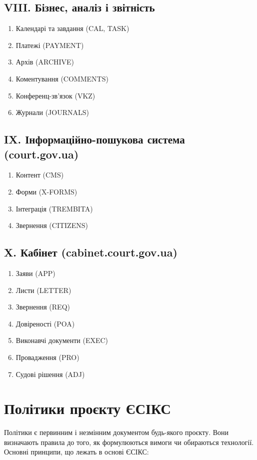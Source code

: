 \subsection{VIII. Бізнес, аналіз і звітність}
\begin{enumerate}
    \item Календарі та завдання (CAL, TASK)
    \item Платежі (PAYMENT)
    \item Архів (ARCHIVE)
    \item Коментування (COMMENTS)
    \item Конференц-зв'язок (VKZ)
    \item Журнали (JOURNALS)
\end{enumerate}

\subsection{IX. Інформаційно-пошукова система (court.gov.ua)}
\begin{enumerate}
    \item Контент (CMS)
    \item Форми (X-FORMS)
    \item Інтеграція (TREMBITA)
    \item Звернення (CITIZENS)
\end{enumerate}

\subsection{X. Кабінет (cabinet.court.gov.ua)}
\begin{enumerate}
    \item Заяви (APP)
    \item Листи (LETTER)
    \item Звернення (REQ)
    \item Довіреності (POA)
    \item Виконавчі документи (EXEC)
    \item Провадження (PRO)
    \item Судові рішення (ADJ)
\end{enumerate}

\newpage
\section{Політики проєкту ЄСІКС}

Політики є первинним і незмінним документом будь-якого проєкту. Вони визначають
правила до того, як формулюються вимоги чи обираються технології. Основні
принципи, що лежать в основі ЄСІКС:

